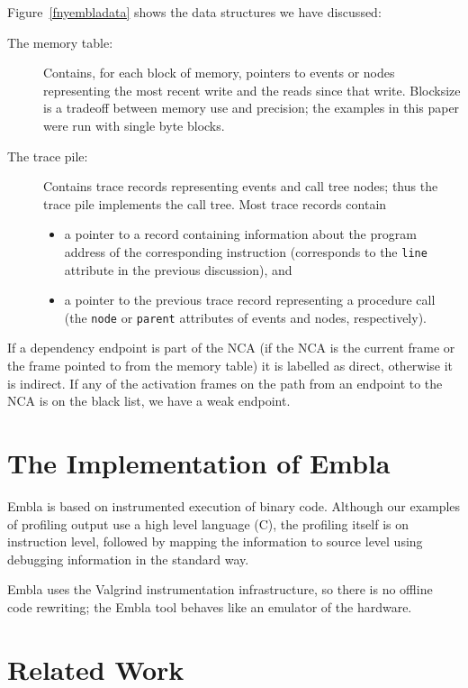 \documentclass{acm_proc_article-sp}
\begin{document}
Figure~\ref{fnyembladata} shows the data structures we have discussed:
\begin{description}
\item[The memory table:]
Contains, for each block of memory, pointers to events or nodes representing
the most recent write and the reads since that write. 
Blocksize is a tradeoff between memory use and precision; the examples in 
this paper were run with single byte blocks. 
\item[The trace pile:]
Contains trace records representing events and call tree nodes; thus the 
trace pile implements the call tree. Most trace records contain 
\begin{itemize}
\item
a pointer to a record containing information about the program 
address of the corresponding instruction (corresponds to the {\tt line} 
attribute in the previous discussion), and
\item
a pointer to the previous trace record representing a procedure call (the 
{\tt node} or {\tt parent} attributes of events and nodes, respectively).
\end{itemize}
\end{description}

If a dependency endpoint is part of the NCA (if the NCA is the current
frame or the frame pointed to from the memory table) it is labelled as
direct, otherwise it is indirect. If any of the activation frames on
the path from an endpoint to the NCA is on the black list, we have a
weak endpoint.




\section{The Implementation of Embla}

Embla is based on instrumented execution of binary code. Although
our examples of profiling output use a high level language (C),
the profiling itself is on instruction level, followed by 
mapping the information to source level using debugging information 
in the standard way.

Embla uses the Valgrind instrumentation infrastructure, so there
is no offline code rewriting; the Embla tool behaves like an emulator
of the hardware.

\section{Related Work}
\end{document}
